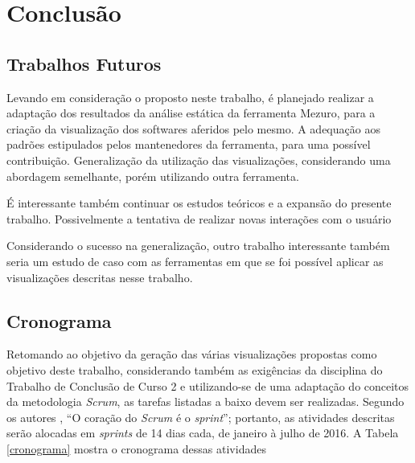 \chapter[Conclusão]{Conclusão}

\section{Trabalhos Futuros}

Levando em consideração o proposto neste trabalho, é planejado realizar a
adaptação dos resultados da análise estática da ferramenta Mezuro, para a
criação da visualização dos softwares aferidos pelo mesmo. A adequação aos
padrões estipulados pelos mantenedores da ferramenta, para uma possível
contribuição. Generalização da utilização das visualizações, considerando uma
abordagem semelhante, porém utilizando outra ferramenta.

É interessante também continuar os estudos teóricos e a expansão do presente
trabalho. Possivelmente a tentativa de realizar novas interações com o usuário

Considerando o sucesso na generalização, outro trabalho interessante também
seria um estudo de caso com as ferramentas em que se foi possível aplicar as
visualizações descritas nesse trabalho.

\section{Cronograma}

Retomando ao objetivo da geração das várias visualizações propostas como
objetivo deste trabalho, considerando também as exigências da disciplina do
Trabalho de Conclusão de Curso 2 e utilizando-se de uma adaptação do conceitos
da metodologia \textit{Scrum}, as tarefas listadas a baixo devem ser realizadas.
Segundo os autores , ``O coração do
\textit{Scrum} é o \textit{sprint}''; portanto, as atividades descritas serão
alocadas em \textit{sprints} de 14 dias cada, de janeiro à julho de 2016. A
Tabela \ref{cronograma} mostra o cronograma dessas atividades


